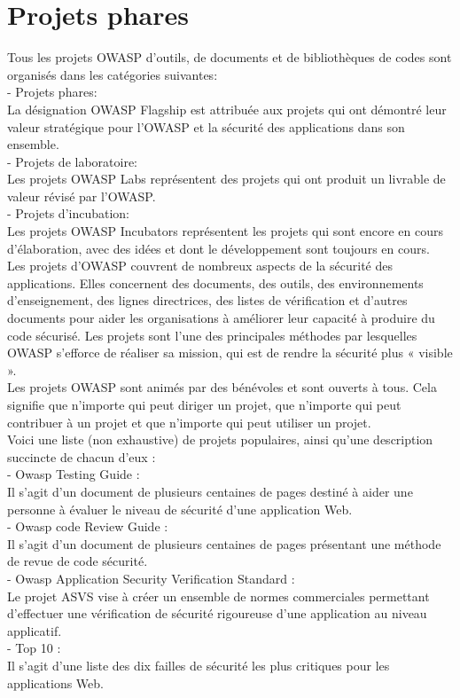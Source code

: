 \section{Projets phares}
Tous les projets OWASP d'outils, de documents et de bibliothèques de codes sont organisés dans les catégories suivantes: \\
- Projets phares: \\
La désignation OWASP Flagship est attribuée aux projets qui ont démontré leur valeur stratégique pour l’OWASP et la sécurité des applications dans son ensemble.\\
- Projets de laboratoire: \\
Les projets OWASP Labs représentent des projets qui ont produit un livrable de valeur révisé par l’OWASP.\\
- Projets d'incubation: \\
Les projets OWASP Incubators représentent les projets qui sont encore en cours d'élaboration, avec des idées et dont le développement sont toujours en cours.\\
Les projets d'OWASP couvrent de nombreux aspects de la sécurité des applications. Elles concernent des documents, des outils, des environnements d'enseignement, des lignes directrices, des listes de vérification et d'autres documents pour aider les organisations à améliorer leur capacité à produire du code sécurisé. Les projets sont l'une des principales méthodes par lesquelles OWASP s'efforce de réaliser sa mission, qui est de rendre la sécurité plus « visible ».\\
Les projets OWASP sont animés par des bénévoles et sont ouverts à tous. Cela signifie que n'importe qui peut diriger un projet, que n'importe qui peut contribuer à un projet et que n'importe qui peut utiliser un projet. \\
Voici une liste (non exhaustive) de projets populaires, ainsi qu’une description succincte de chacun d'eux :\\
- Owasp Testing Guide : \\
Il s'agit d'un document de plusieurs centaines de pages destiné à aider une personne à évaluer le niveau de sécurité d'une application Web. \\
- Owasp code Review Guide : \\
Il s'agit d'un document de plusieurs centaines de pages présentant une méthode de revue de code sécurité.\\
- Owasp Application Security Verification Standard : \\
Le projet ASVS vise à créer un ensemble de normes commerciales permettant d'effectuer une vérification de sécurité rigoureuse d’une application au niveau applicatif.\\
- Top 10 : \\
Il s'agit d'une liste des dix failles de sécurité les plus critiques pour les applications Web.\\

